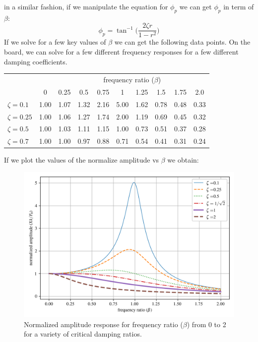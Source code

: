 \documentclass[12pt,letter]{article}
\numberwithin{ex}{section} %
\numberwithin{re}{section} %
\begin{document}
			in a similar fashion, if we manipulate the equation for $\phi_p$ we can get $\phi_p$ in term of $\beta$:
			\begin{equation}
				\phi_p = \tan^{-1} \bigg(\frac{2 \zeta r}{1-r^2}\bigg)
			\end{equation}	
			If we solve for a few key values of $\beta$ we can get the following data points. On the board, we can solve for a few different frequency responses for a few different damping coefficients. 
			\begin{table}[H]
				\centering
				\begin{tabular}{@{}lccccccccc@{}}
				\toprule
				 & & \multicolumn{8}{c}{frequency ratio ($\beta$)} \\ 
				 & 0 & 0.25& 0.5& 0.75& 1& 1.25& 1.5& 1.75& 2.0 \\ \midrule
				$\zeta=0.1$	&	1.00&	1.07&	1.32&	2.16&	5.00&	1.62&	0.78&	0.48 & 0.33 \\ 
				$\zeta=0.25$	&	1.00&	1.06&	1.27&	1.74&	2.00&	1.19&	0.69&	0.45 & 0.32 \\ 
				$\zeta=0.5$	&	1.00&	1.03&	1.11&	1.15&	1.00&	0.73&	0.51&	0.37 & 0.28\\ 
				$\zeta=0.7$	&	1.00&  1.00	&   0.97&	0.88&	0.71&	0.54&	0.41&	0.31 & 0.24\\\bottomrule
				\end{tabular}
			\end{table}
			If we plot the values of the normalize amplitude vs $\beta$ we obtain:
			\begin{figure}[H]
				\centering
				\includegraphics[]{../figures/underdamped_frequency_response_amplitude.png}
				\caption{Normalized amplitude response for frequency ratio ($\beta$) from 0 to 2 for a variety of critical damping ratios.}
			\end{figure}			
\end{document}
